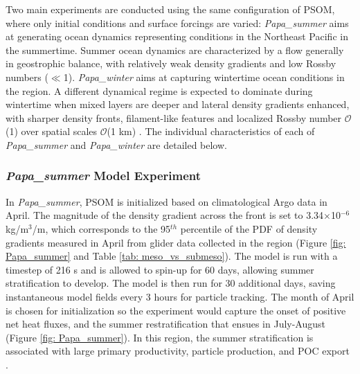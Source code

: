 \documentclass[article,linenumbers]{agujournal2018}
\begin{document}
Two main experiments are conducted using the same configuration of PSOM, where only initial conditions and surface forcings are varied: \textit{Papa\_summer} aims at generating ocean dynamics representing conditions in the Northeast Pacific in the summertime. Summer ocean dynamics are characterized by a flow generally in geostrophic balance, with relatively weak density gradients and low Rossby numbers ($\ll$1). \textit{Papa\_winter} aims at capturing wintertime ocean conditions in the region. A different dynamical regime is expected to dominate during wintertime when mixed layers are deeper and lateral density gradients enhanced, with sharper density fronts, filament-like features and localized Rossby number $\mathcal{O}$(1) over spatial scales $\mathcal{O}$(1 km) \citep{Mensa_2013,Callies_2015,Thompson_2016}. The individual characteristics of each of \linebreak \textit{Papa\_summer} and \textit{Papa\_winter} are detailed below.

\subsubsection{\textit{Papa\_summer} Model Experiment}

In \textit{Papa\_summer}, PSOM is initialized based on climatological Argo data in April. The magnitude of the density gradient across the front is set to 3.34$\times$10$^{-6}$ kg/m$^3$/m, which corresponds to the 95$^{th}$ percentile of the PDF of density gradients measured in April from glider data collected in the region (Figure \ref{fig: Papa_summer} and Table \ref{tab: meso_vs_submeso}). The model is run with a timestep of 216 s and is allowed to spin-up for 60 days, allowing summer stratification to develop. The model is then run for 30 additional days, saving instantaneous model fields every 3 hours for particle tracking. The month of April is chosen for initialization so the experiment would capture the onset of positive net heat fluxes, and the summer restratification that ensues in July-August (Figure \ref{fig: Papa_summer}). In this region, the summer stratification is associated with large primary productivity, particle production, and POC export \citep[e.g., fecal pellets, dead phytoplankter; ][]{Plant_2016}.
\end{document}
